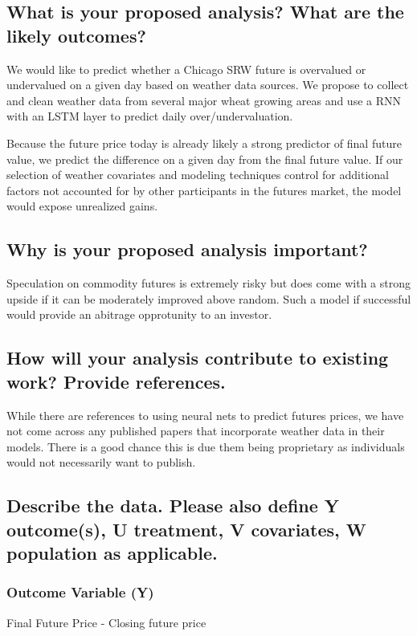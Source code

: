 \documentclass[twoside,11pt]{article}
\begin{document}
\subsection{What is your proposed analysis? What are the likely outcomes?}

We would like to predict whether a Chicago SRW future is overvalued or undervalued on a given day based on weather data sources. We propose to collect and clean weather data from several major wheat growing areas and use a RNN with an LSTM layer to predict daily over/undervaluation. 

Because the future price today is already likely a strong predictor of final future value, we predict the difference on a given day from the final future value. If our selection of weather covariates and modeling techniques control for additional factors not accounted for by other participants in the futures market, the model would expose unrealized gains.  

\subsection{Why is your proposed analysis important?}

Speculation on commodity futures is extremely risky but does come with a strong upside if it can be moderately improved above random. Such a model if successful would provide an abitrage opprotunity to an investor. 

\subsection{How will your analysis contribute to existing work? Provide references.}

While there are references to using neural nets to predict futures prices, we have not come across any published papers that incorporate weather data in their models.  There is a good chance this is due them being proprietary as individuals would not necessarily want to publish.  


\subsection{Describe the data. Please also define Y outcome(s), U treatment, V covariates, W population as applicable.}

\subsubsection{Outcome Variable (Y)}
Final Future Price - Closing future price
\end{document}
